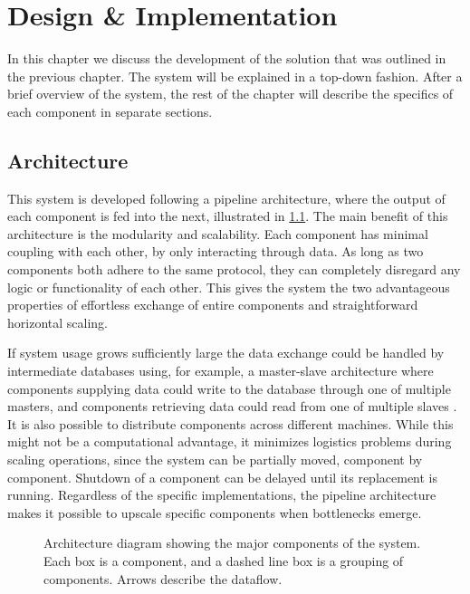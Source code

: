 \chapter{Design \& Implementation}\label{chap:design}
In this chapter we discuss the development of the solution that was outlined in the previous chapter. The system will be explained in a top-down fashion. After a brief overview of the system, the rest of the chapter will describe the specifics of each component in separate sections.

\section{Architecture}\label{sec:design_overview}
This system is developed following a pipeline architecture, where the output of each component is fed into the next, illustrated in \cref{fig:system-overview}. The main benefit of this architecture is the modularity and scalability. Each component has minimal coupling with each other, by only interacting through data. As long as two components both adhere to the same protocol, they can completely disregard any logic or functionality of each other. This gives the system the two advantageous properties of effortless exchange of entire components and straightforward horizontal scaling.

If system usage grows sufficiently large the data exchange could be handled by intermediate databases using, for example, a master-slave architecture where components supplying data could write to the database through one of multiple masters, and components retrieving data could read from one of multiple slaves . It is also possible to distribute components across different machines. While this might not be a computational advantage, it minimizes logistics problems during scaling operations, since the system can be partially moved, component by component. Shutdown of a component can be delayed until its replacement is running. Regardless of the specific implementations, the pipeline architecture makes it possible to upscale specific components when bottlenecks emerge.

\begin{figure}[tb]%
  \centering
  
\caption[Architecture diagram showing the major components of the system]{Architecture diagram showing the major components of the system. Each box is a component, and a dashed line box is a grouping of components. Arrows describe the dataflow.}%
\label{fig:system-overview}%
\end{figure}

